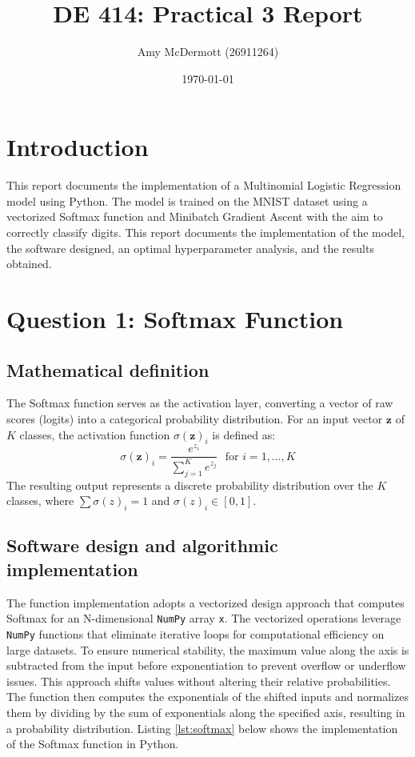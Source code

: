 \documentclass[11pt]{article}
\title{DE 414: Practical 3 Report}
\author{Amy McDermott (26911264)}
\date{\today}
\begin{document}
\maketitle

\section*{Introduction}
This report documents the implementation of a Multinomial Logistic Regression model using Python. The model is trained on the MNIST dataset using a vectorized 
Softmax function and Minibatch Gradient Ascent with the aim to correctly classify digits. This report documents the implementation of the model, the software designed, an optimal hyperparameter analysis, and the results obtained.

\section*{Question 1: Softmax Function}
\subsection*{Mathematical definition}
The Softmax function serves as the activation layer, converting a vector of raw scores (logits) into a categorical probability distribution. For an input vector $\mathbf{z}$ of $K$ classes, the 
activation function $\sigma(\mathbf{z})_i$ is defined as:
\begin{equation}
\sigma(\mathbf{z})_i = \frac{e^{z_i}}{\sum_{j=1}^{K} e^{z_j}} \ \ \ \text{for } i = 1, \dots, K
\end{equation}
The resulting output represents a discrete probability distribution over the $K$ classes, where $\sum \sigma(z)_i = 1$ and $\sigma(z)_i \in [0, 1]$.

\subsection*{Software design and algorithmic implementation}
The function implementation adopts a vectorized design approach that computes Softmax for an N-dimensional \texttt{NumPy} array \texttt{x}. The vectorized 
operations leverage \texttt{NumPy} functions that eliminate iterative loops for computational efficiency on large datasets.
To ensure numerical stability, the maximum value along the axis is subtracted from the input before exponentiation to prevent overflow or underflow issues. This approach shifts values without altering their relative probabilities.
The function then computes the exponentials of the shifted inputs and normalizes them by dividing by the sum of exponentials along the specified axis, resulting in a probability distribution.
Listing \ref{lst:softmax} below shows the implementation of the Softmax function in Python.
\end{document}

